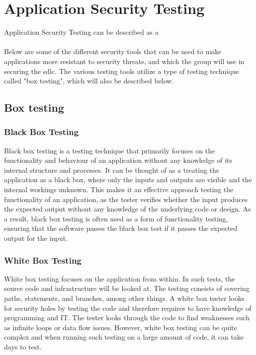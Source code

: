 \section{Application Security Testing}
Application Security Testing can be described as a \cite{AST}
\\~\\
Below are some of the different security tools that can be used to make applications more resistant to security threats, and which the group will use in securing the \acrshort{sdlc}. 
The various testing tools utilize a type of testing technique called "box testing", which will also be described below. 

\subsection{Box testing}
\label{boxtesting}

\subsubsection{Black Box Testing}
\label{BlackBoxTesting}
Black box testing is a testing technique that primarily focuses on the functionality and behaviour of an application without any knowledge of its internal structure and processes. It can be thought of as a treating the application as a black box, where   only the inputs and outputs are visible and the internal workings unknown. This makes it an effective approach testing the functionality of an application, as the tester verifies whether the input produces the expected output without any knowledge of the underlying code or design. As a result, black box testing is often used as a form of functionality testing\cite{BlackBoxTestingFunctional}, ensuring that the software passes the black box test if it passes the expected output for the input. \cite{blackbox}


\subsubsection{White Box Testing}
White box testing focuses on the application from within. In such tests, the source code and infrastructure will be looked at. The testing consists of covering paths, statements, and branches, among other things. A white box tester looks for security holes by testing the code and therefore requires to have knowledge of programming and IT. The tester looks through the code to find weaknesses such as infinite loops or data flow issues. However, white box testing can be quite complex and when running such testing on a large amount of code, it can take days to test. \cite{whitebox}

